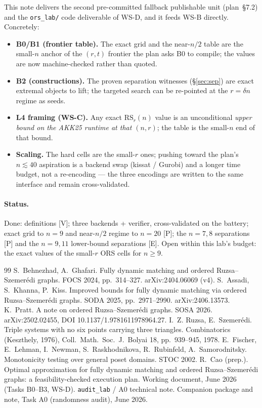 \documentclass[11pt]{article}
\newcommand{\statusV}{\textsf{\footnotesize[V]}}
\newcommand{\statusP}{\textsf{\footnotesize[P]}}
\newcommand{\statusE}{\textsf{\footnotesize[E]}}
\newcommand{\RS}{\mathrm{RS}}
\begin{document}
This note delivers the second pre-committed fallback publishable unit
(plan~\S7.2) and the \texttt{ors\_lab/} code deliverable of WS-D, and it feeds
WS-B directly. Concretely:

\begin{itemize}
\item \textbf{B0/B1 (frontier table).} The exact grid and the near-$n/2$ table
are the small-$n$ anchor of the $(r,t)$ frontier the plan asks B0 to compile;
the values are now machine-checked rather than quoted.
\item \textbf{B2 (constructions).} The proven separation witnesses
(\S\ref{sec:sep}) are exact extremal objects to lift; the targeted search can
be re-pointed at the $r=\delta n$ regime as seeds.
\item \textbf{L4 framing (WS-C).} Any exact $\RS_r(n)$ value is an
unconditional \emph{upper bound on the AKK25 runtime at that $(n,r)$}; the
table is the small-$n$ end of that bound.
\item \textbf{Scaling.} The hard cells are the small-$r$ ones; pushing toward
the plan's $n\lesssim 40$ aspiration is a backend swap (kissat / Gurobi) and a
longer time budget, not a re-encoding --- the three encodings are written to
the same interface and remain cross-validated.
\end{itemize}

\paragraph{Status.} Done: definitions \statusV; three backends + verifier,
cross-validated on the battery; exact grid to $n=9$ and near-$n/2$ regime to
$n=20$ \statusP; the $n=7,8$ separations \statusP{} and the $n=9,11$
lower-bound separations \statusE. Open within this lab's budget: the exact
values of the small-$r$ ORS cells for $n\ge 9$.

\begin{thebibliography}{99}\footnotesize
{} S.~Behnezhad, A.~Ghafari. Fully dynamic matching and ordered
Ruzsa--Szemer\'edi graphs. FOCS 2024, pp.~314--327. arXiv:2404.06069 (v4).
 S.~Assadi, S.~Khanna, P.~Kiss. Improved bounds for fully
dynamic matching via ordered Ruzsa--Szemer\'edi graphs. SODA 2025,
pp.~2971--2990. arXiv:2406.13573.
 K.~Pratt. A note on ordered Ruzsa--Szemer\'edi graphs. SOSA
2026. arXiv:2502.02455, DOI 10.1137/1.9781611978964.27.
 I.~Z. Ruzsa, E.~Szemer\'edi. Triple systems with no six points
carrying three triangles. Combinatorics (Keszthely, 1976), Coll.\ Math.\ Soc.\
J.\ Bolyai 18, pp.~939--945, 1978.
 E.~Fischer, E.~Lehman, I.~Newman, S.~Raskhodnikova,
R.~Rubinfeld, A.~Samorodnitsky. Monotonicity testing over general poset
domains. STOC 2002.
 R.~Cao (prep.). Optimal approximation for fully dynamic
matching and ordered Ruzsa--Szemer\'edi graphs: a feasibility-checked
execution plan. Working document, June 2026 (Tasks B0--B3, WS-D).
\bibitem{A0} \texttt{audit\_lab} / A0 technical note. Companion package and
note, Task A0 (randomness audit), June 2026.
\end{thebibliography}
\end{document}
